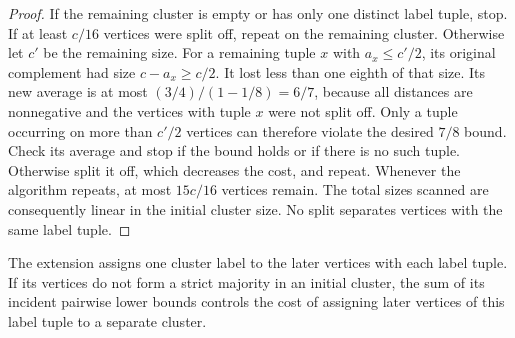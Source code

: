 \documentclass[11pt]{article}
\begin{document}
\begin{proof}
If the remaining cluster is empty or has only one distinct label tuple, stop. If at least
$c/16$ vertices were split off, repeat on the remaining cluster. Otherwise let
$c'$ be the remaining size. For a remaining tuple $x$ with $a_x\le c'/2$,
its original complement had size $c-a_x\ge c/2$. It lost less than
one eighth of that size. Its new average is at most
$(3/4)/(1-1/8)=6/7$, because all distances are nonnegative and the
vertices with tuple $x$ were not split off. Only a tuple occurring on more than $c'/2$ vertices
can therefore violate the desired $7/8$ bound. Check its average
and stop if the bound holds or if there is no such tuple. Otherwise
split it off, which decreases the cost, and repeat. Whenever the
algorithm repeats, at most $15c/16$ vertices remain. The total sizes
scanned are consequently linear in the initial cluster size. No
split separates vertices with the same label tuple.
\end{proof}

The extension assigns one cluster label to the later vertices with each
label tuple. If its
vertices do not form a strict majority in an initial cluster, the
sum of its incident pairwise lower bounds controls the cost of assigning
later vertices of this label tuple to a separate cluster.
\end{document}

